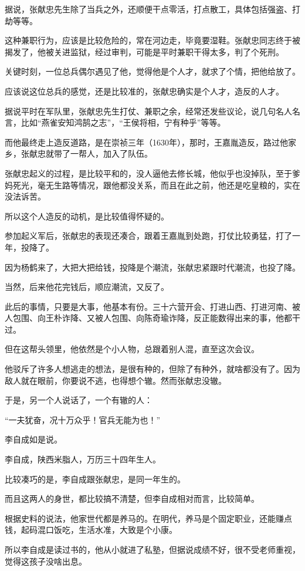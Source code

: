 \begin{multicols}{\theparacolNo}
		据说，张献忠先生除了当兵之外，还顺便干点零活，打点散工，具体包括强盗、打劫等等。

		这种兼职行为，应该是比较危险的，常在河边走，毕竟要湿鞋。张献忠同志终于被揭发了，他被关进监狱，经过审判，可能是平时兼职干得太多，判了个死刑。

		关键时刻，一位总兵偶尔遇见了他，觉得他是个人才，就求了个情，把他给放了。

		应该说这位总兵的感觉，还是比较准的，张献忠确实是个人才，造反的人才。

		据说平时在军队里，张献忠先生打仗、兼职之余，经常还发些议论，说几句名人名言，比如“燕雀安知鸿鹄之志”，“王侯将相，宁有种乎”等等。

		而他最终走上造反道路，是在崇祯三年（1630年），那时，王嘉胤造反，路过他家乡，张献忠就带了一帮人，加入了队伍。

		张献忠起义的过程，是比较平和的，没人逼他去修长城，他似乎也没掉队，至于爹妈死光，毫无生路等情况，跟他都没关系，而且在此之前，他还是吃皇粮的，实在没法诉苦。

		所以这个人造反的动机，是比较值得怀疑的。

		参加起义军后，张献忠的表现还凑合，跟着王嘉胤到处跑，打仗比较勇猛，打了一年，投降了。

		因为杨鹤来了，大把大把给钱，投降是个潮流，张献忠紧跟时代潮流，也投了降。

		当然，后来他花完钱后，顺应潮流，又反了。

		此后的事情，只要是大事，他基本有份。三十六营开会、打进山西、打进河南、被人包围、向王朴诈降、又被人包围、向陈奇瑜诈降，反正能数得出来的事，他都干过。

		但在这帮头领里，他依然是个小人物，总跟着别人混，直至这次会议。

		他驳斥了许多人想逃走的想法，是很有种的，但除了有种外，就啥都没有了。因为敌人就在眼前，你要说不逃，也得想个辙。然而张献忠没辙。

		于是，另一个人说话了，一个有辙的人：

		“一夫犹奋，况十万众乎！官兵无能为也！”

		李自成如是说。

		李自成，陕西米脂人，万历三十四年生人。

		比较凑巧的是，李自成跟张献忠，是同一年生的。

		而且这两人的身世，都比较搞不清楚，但李自成相对而言，比较简单。

		根据史料的说法，他家世代都是养马的。在明代，养马是个固定职业，还能赚点钱，起码混口饭吃，生活水准，大致是个小康。

		所以李自成是读过书的，他从小就进了私塾，但据说成绩不好，很不受老师重视，觉得这孩子没啥出息。


\end{multicols}
